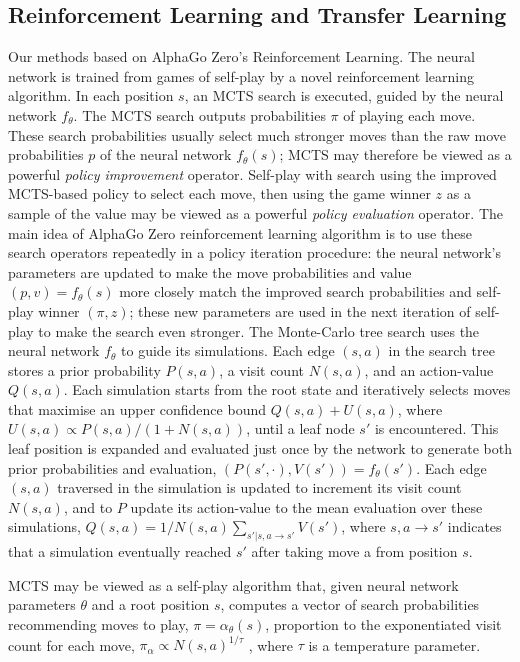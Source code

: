 \documentclass[12pt,a4paper]{article}
\begin{document}
\subsection{Reinforcement Learning and Transfer Learning}
\hspace{0.6cm}Our methods based on AlphaGo Zero's Reinforcement Learning. The neural network is trained from games of self-play by a novel reinforcement learning algorithm. In each position \(s\), an MCTS search is executed, guided by the neural network \(f_\theta\). The MCTS search outputs probabilities \(\pi\) of playing each move. These search probabilities usually select much stronger moves than the raw move probabilities \(p\) of the neural network \(f_\theta(s)\); MCTS may therefore be viewed as a powerful \textit{policy improvement} operator\cite{Howard}. Self-play with search using the improved MCTS-based policy to select each move, then using the game winner \(z\) as a sample of the value may be viewed as a powerful \textit{policy evaluation} operator. The main idea of AlphaGo Zero reinforcement learning algorithm is to use these search operators repeatedly in a policy iteration procedure: the neural network’s parameters are updated to make the move probabilities and value \((p, v) = f_\theta(s)\) more closely match the improved search probabilities and self-play winner \((\pi, z)\); these new parameters are used in the next iteration of self-play to make the search even stronger. The Monte-Carlo tree search uses the neural network \(f_\theta\) to guide its simulations. Each edge \((s, a)\) in the search tree stores a prior probability \(P(s, a)\), a visit count \(N(s, a)\), and an action-value \(Q(s, a)\). Each simulation starts from the root state and iteratively selects moves that maximise an upper confidence bound \(Q(s, a) + U(s, a)\), where \(U(s, a) \propto P(s, a)/(1 + N(s, a))\)\cite{AlphaGo}, until a leaf node \(s'\) is encountered. This leaf position is expanded and evaluated just once by the network to generate both prior probabilities and evaluation, \((P(s', ·), V(s')) = f_θ (s')\). Each edge \((s, a)\) traversed in the simulation is updated to increment its visit count \(N(s, a)\), and to \(P\) update its action-value to the mean evaluation over these simulations, \(Q(s, a) = 1/N(s, a) \sum_{s'|s,a\to s'}V(s')\), where \(s,a\to s'\) indicates that a simulation eventually reached \(s'\) after taking move a from position \(s\).\par
MCTS may be viewed as a self-play algorithm that, given neural network parameters \(\theta\) and a root position \(s\), computes a vector of search probabilities recommending moves to play, \(\pi = \alpha_\theta(s)\), proportion to the exponentiated visit count for each move, \(\pi_\alpha \propto N(s, a)^{1/\tau}\) , where \(\tau\) is a temperature parameter.\par
\end{document}
